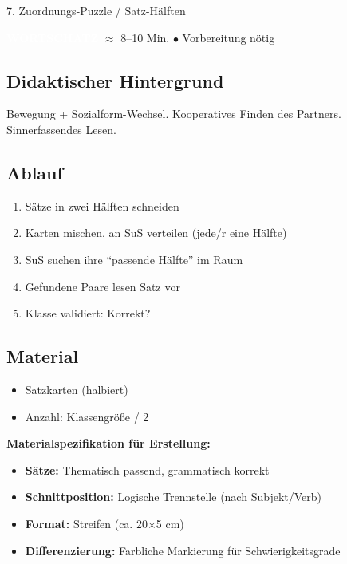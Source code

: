 \documentclass[11pt, a4paper]{article}
\newcommand{\tagWortschatz}{\colorbox{wortschatz}{\textcolor{white}{\footnotesize\textbf{WORTSCHATZ}}}}
\newcommand{\zeit}[1]{\textcolor{grau}{\footnotesize $\approx$ #1 Min.}}
\newcommand{\matVorbereitung}{\textcolor{akzent}{$\bullet$ Vorbereitung nötig}}
\begin{document}
\vspace{1em}

\begin{methode}{7. Zuordnungs-Puzzle / Satz-Hälften}

\tagWortschatz{} \zeit{8--10} \hfill \matVorbereitung

\subsection*{Didaktischer Hintergrund}
Bewegung + Sozialform-Wechsel. Kooperatives Finden des Partners. Sinnerfassendes Lesen.

\subsection*{Ablauf}
\begin{enumerate}[leftmargin=*]
    \item Sätze in zwei Hälften schneiden
    \item Karten mischen, an SuS verteilen (jede/r eine Hälfte)
    \item SuS suchen ihre ``passende Hälfte'' im Raum
    \item Gefundene Paare lesen Satz vor
    \item Klasse validiert: Korrekt?
\end{enumerate}

\subsection*{Material}
\begin{materialbox}
\begin{itemize}[label=$\square$, leftmargin=*]
    \item Satzkarten (halbiert)
    \item Anzahl: Klassengröße / 2
\end{itemize}

\textbf{Materialspezifikation für Erstellung:}
\begin{itemize}[leftmargin=*]
    \item \textbf{Sätze:} Thematisch passend, grammatisch korrekt
    \item \textbf{Schnittposition:} Logische Trennstelle (nach Subjekt/Verb)
    \item \textbf{Format:} Streifen (ca. 20$\times$5 cm)
    \item \textbf{Differenzierung:} Farbliche Markierung für Schwierigkeitsgrade
\end{itemize}
\end{materialbox}

\end{methode}
\end{document}
